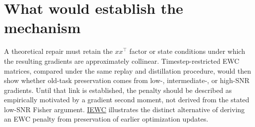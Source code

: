 \documentclass[11pt]{article}
\begin{document}
\section{What would establish the mechanism}\label{what-would-establish-the-mechanism}

A theoretical repair must retain the \(xx^\top\) factor or state conditions under which the resulting gradients are approximately collinear. Timestep-restricted EWC matrices, compared under the same replay and distillation procedure, would then show whether old-task preservation comes from low-, intermediate-, or high-SNR gradients. Until that link is established, the penalty should be described as empirically motivated by a gradient second moment, not derived from the stated low-SNR Fisher argument. \href{https://arxiv.org/abs/2611.16039}{IEWC} illustrates the distinct alternative of deriving an EWC penalty from preservation of earlier optimization updates.
\end{document}
